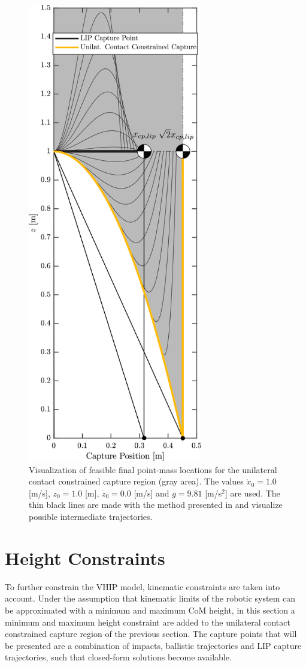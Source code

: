 \begin{figure}
\centering
\includegraphics[width=3.0in]{STYLESTUFF/CPvsBalistic4.png}
\caption{Visualization of feasible final point-mass locations for the unilateral contact constrained capture region (gray area). The values $\dot{x}_0=1.0$ [m/s], $z_0=1.0$ [m], $\dot{z}_0=0.0$ [m/s] and $g=9.81$ [m/s$^2$] are used. The thin black lines are made with the method presented in \cite{koolen2016balance} and visualize possible intermediate trajectories.}
\label{fig:cpbal}
\end{figure}

\section{Height Constraints}
To further constrain the \ac{VHIP} model, kinematic constraints are taken into account. Under the assumption that kinematic limits of the robotic system can be approximated with a minimum and maximum \ac{CoM} height, in this section a minimum and maximum height constraint are added to the unilateral contact constrained capture region of the previous section. The capture points that will be presented are a combination of impacts, ballistic trajectories and \ac{LIP} capture trajectories, such that closed-form solutions become available. 

